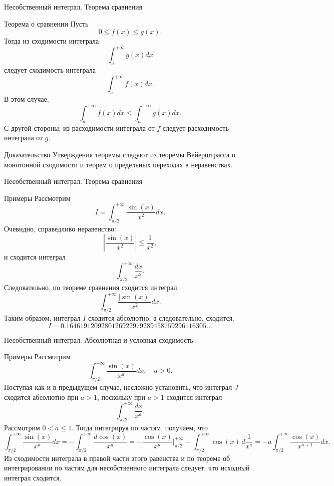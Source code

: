 \documentclass[8pt]{beamer}
\begin{document}
\begin{frame}{Несобственный интеграл. Теорема сравнения}
\begin{block}{Теорема о сравнении}
Пусть 
$$0\le f(x) \le g(x).$$
Тогда из сходимости интеграла
$$\int_a^{+\infty} g(x)dx$$
следует сходимость интеграла
$$\int_a^{+\infty} f(x)dx.$$
В этом случае,
$$\int_a^{+\infty} f(x)dx\le \int_a^{+\infty} g(x)dx.$$
С другой стороны, из расходимости интеграла от $f$ следует расходимость интеграла от $g$.
\end{block}
\begin{block}{Доказательство}
Утверждения теоремы следуют из теоремы Вейерштрасса о монотонной сходимости и теорем о предельных переходах в неравенствах.
\end{block}
\end{frame}

\begin{frame}{Несобственный интеграл. Теорема сравнения}
\begin{block}{Примеры}
Рассмотрим
$$I = \int_{\pi/2}^{+\infty} \frac{\sin(x)}{x^2}dx.$$
Очевидно, справедливо неравенство:
$$\left| \frac{\sin(x)}{x^2} \right| \le \frac{1}{x^2},$$
и сходится интеграл
$$\int_{\pi/2}^{+\infty} \frac{dx}{x^2}.$$
Следовательно, по теореме сравнения сходится интеграл
$$\int_{\pi/2}^{+\infty}\frac{|\sin(x)|}{x^2}dx.$$
Таким образом, интеграл $I$ сходится абсолютно, а следовательно, сходится. 
$$I = 0.1646191209280126922979289458759296116305\ldots$$
\end{block}
\end{frame}

\begin{frame}{Несобственный интеграл. Абсолютная и условная сходимость}
\begin{block}{Примеры}
Рассмотрим 
$$\int_{\pi/2}^{+\infty} \frac{\sin(x)}{x^a}dx, \quad a>0.$$
Поступая как и в предыдущем случае, несложно установить, что интеграл $J$ сходится абсолютно при $a>1$, поскольку при $a>1$ сходится интеграл
$$\int_{\pi/2}^{+\infty} \frac{dx}{x^a}.$$
Рассмотрим $0<a\le 1$. Тогда интегрируя по частям, получаем, что
$$ \int_{\pi/2}^{+\infty} \frac{\sin(x)}{x^a}dx = -\int_{\pi/2}^{+\infty} \frac{d \cos(x)}{x^a} = -\frac{\cos(x)}{x^a}\Big|_{\pi/2}^{+\infty} +\int_{\pi/2}^{+\infty} \cos(x)\,d\frac{1}{x^a} =
- a \int_{\pi/2}^{+\infty} \frac{\cos(x)}{x^{a+1}}dx.$$
Из сходимости интеграла в правой части этого равенства и по теореме об интегрировании по частям для несобственного интеграла следует, что исходный интеграл сходится.
\end{block}
\end{frame}
\end{document}
